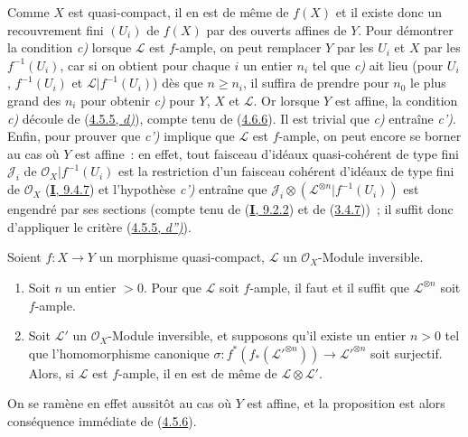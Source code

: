 Comme $X$ est quasi-compact, il en est de même de $f(X)$ et il existe donc
un recouvrement fini $(U_i)$ de $f(X)$ par des ouverts affines de $Y$. Pour
démontrer la condition \emph{c)} lorsque $\mathcal{L}$ est $f$-ample, on peut
remplacer $Y$ par les $U_i$ et $X$ par les $f^{-1}(U_i)$, car si on obtient
pour chaque $i$ un entier $n_i$ tel que \emph{c)} ait lieu (pour $U_i$,
$f^{-1}(U_i)$ et $\mathcal{L}|f^{-1}(U_i)$) dès que $n\geq n_i$, il
suffira de prendre pour $n_0$ le plus grand des $n_i$ pour obtenir \emph{c)} pour
$Y$, $X$ et $\mathcal{L}$. Or lorsque $Y$ est affine, la condition \emph{c)}
découle de (\hyperref[II.4.5.5-fr]{4.5.5, \emph{d)}}), compte tenu de
(\hyperref[II.4.6.6-fr]{4.6.6}). Il est trivial que \emph{c)} entraîne \emph{c')}. Enfin,
pour prouver que \emph{c')} implique que $\mathcal{L}$ est $f$-ample, on peut
encore se borner au cas où $Y$ est affine~: en effet, tout faisceau
d'idéaux quasi-cohérent de type fini $\mathcal{J}_i$ de
$\mathcal{O}_X|f^{-1}(U_i)$ est la restriction d'un faisceau cohérent
d'idéaux de type fini de $\mathcal{O}_X$
(\hyperref[I.9.4.7-fr]{\textbf{I}, 9.4.7}) et l'hypothèse \emph{c')} entraîne que
$\mathcal{J}_i\otimes(\mathcal{L}^{\otimes n}|f^{-1}(U_i))$ est engendré
par ses sections (compte tenu de (\hyperref[I.9.2.2-fr]{\textbf{I}, 9.2.2}) et de
(\hyperref[II.3.4.7-fr]{3.4.7}))~; il suffit donc d'appliquer le critère
(\hyperref[II.4.5.5-fr]{4.5.5, \emph{d'')}}).

\begin{proposition}[4.6.9]
\label{II.4.6.9-fr}
Soient $f:X\to Y$ un morphisme quasi-compact, $\mathcal{L}$ un
$\mathcal{O}_X$-Module inversible.
\begin{enumerate}
  \item[\rm{(i)}] Soit $n$ un entier $>0$. Pour que $\mathcal{L}$ soit
  $f$-ample, il faut et il suffit que $\mathcal{L}^{\otimes n}$ soit
  $f$-ample.
  \item[\rm{(ii)}] Soit $\mathcal{L}'$ un $\mathcal{O}_X$-Module
  inversible, et supposons qu'il existe un entier $n>0$ tel que
  l'homomorphisme canonique
  $\sigma:f^*(f_*(\mathcal{L}'^{\otimes n}))\to
  \mathcal{L}'^{\otimes n}$ soit surjectif. Alors, si $\mathcal{L}$ est
  $f$-ample, il en est de même de $\mathcal{L}\otimes\mathcal{L}'$.
\end{enumerate}
\end{proposition}

On se ramène en effet aussitôt au cas où $Y$ est affine, et la proposition
est alors conséquence immédiate de (\hyperref[II.4.5.6-fr]{4.5.6}).

